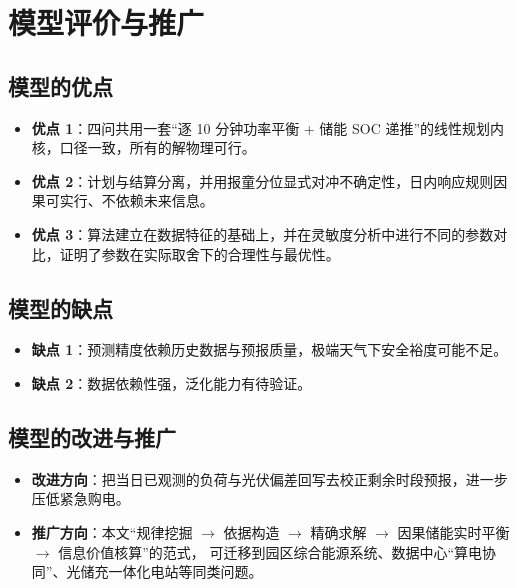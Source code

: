 \documentclass[withoutpreface,bwprint]{cumcmthesis}
\begin{document}
\section{模型评价与推广}

\subsection{模型的优点}

\begin{itemize}[leftmargin=2.2em, itemsep=2pt]
\item \textbf{优点 1}：四问共用一套“逐 10 分钟功率平衡 + 储能 SOC 递推”的线性规划内核，口径一致，所有的解物理可行。
\item \textbf{优点 2}：计划与结算分离，并用报童分位显式对冲不确定性，日内响应规则因果可实行、不依赖未来信息。
\item \textbf{优点 3}：算法建立在数据特征的基础上，并在灵敏度分析中进行不同的参数对比，证明了参数在实际取舍下的合理性与最优性。
\end{itemize}

\subsection{模型的缺点}

\begin{itemize}[leftmargin=2.2em, itemsep=2pt]
\item \textbf{缺点 1}：预测精度依赖历史数据与预报质量，极端天气下安全裕度可能不足。
\item \textbf{缺点 2}：数据依赖性强，泛化能力有待验证。
\end{itemize}

\subsection{模型的改进与推广}

\begin{itemize}[leftmargin=2.2em, itemsep=2pt]
\item \textbf{改进方向}：把当日已观测的负荷与光伏偏差回写去校正剩余时段预报，进一步压低紧急购电。
\item \textbf{推广方向}：本文“规律挖掘 $\to$ 依据构造 $\to$ 精确求解 $\to$ 因果储能实时平衡 $\to$ 信息价值核算”的范式，
可迁移到园区综合能源系统、数据中心“算电协同”、光储充一体化电站等同类问题。
\end{itemize}


\end{document}
